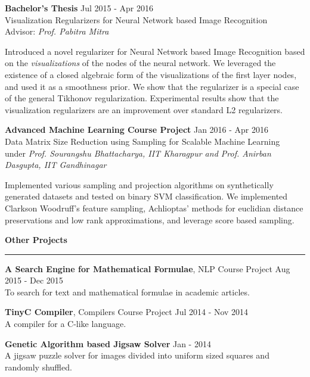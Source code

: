 \documentclass[10pt]{article}
\newcommand{\heading}[1]{
 {\large \textbf{#1}}
  \vspace{0.4em}
  \hrule
  \vspace{0.4em}
}
\newcommand{\EntryGap}{\vspace{0.8em}}
\newcommand{\SmallEntryGap}{\vspace{0.4em}}
\newcommand{\indentedpar}[1]{
  \hangindent=1cm \hangafter=0 #1
}
\begin{document}
\textbf{Bachelor's Thesis} \hfill Jul 2015 - Apr 2016\\
Visualization Regularizers for Neural Network based Image Recognition\\
Advisor: \emph{Prof. Pabitra Mitra}

\SmallEntryGap

\indentedpar{
    Introduced a novel regularizer for Neural Network based Image Recognition
    based on the \emph{visualizations} of the nodes of the neural
    network. We leveraged the existence of a closed algebraic form of the
    visualizations of the first layer nodes, and used it as a smoothness prior.
    We show that the regularizer is a special case of the 
    general Tikhonov regularization. Experimental results show that the 
    visualization regularizers are an improvement over standard L2 regularizers.
}

\EntryGap

\textbf{Advanced Machine Learning Course Project} \hfill Jan 2016 - Apr 2016 \\
Data Matrix Size Reduction using Sampling for Scalable Machine Learning\\
under \emph{Prof. Sourangshu Bhattacharya, IIT Kharagpur and Prof. Anirban Dasgupta, IIT Gandhinagar}

\SmallEntryGap

\indentedpar{
  Implemented various sampling and projection algorithms on synthetically generated
  datasets and tested on binary SVM classification. We implemented Clarkson Woodruff's
  feature sampling, Achlioptas' methods for euclidian distance preservations and 
  low rank approximations, and leverage score based sampling.
}



\EntryGap

\heading{Other Projects}
  \SmallEntryGap
  \textbf{A Search Engine for Mathematical Formulae}, NLP Course Project \hfill Aug 2015 - Dec 2015\\
  To search for text and mathematical formulae in academic articles.
  \SmallEntryGap
  
  \textbf{TinyC Compiler}, Compilers Course Project \hfill Jul 2014 - Nov 2014\\
  A compiler for a C-like language.
  \SmallEntryGap
  
  \textbf{Genetic Algorithm based Jigsaw Solver} \hfill Jan - 2014\\
  A jigsaw puzzle solver for images divided into uniform sized squares and randomly shuffled.
\end{document}
